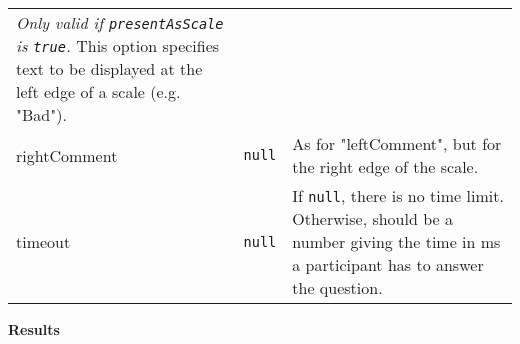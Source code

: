 \documentclass[
]{article}
\begin{document}
\begin{RaggedRight}
\begin{longtable}[]{p{1.7in}p{1in}p{3.15in}}
\begin{minipage}[t]{0.61\columnwidth}
\emph{Only valid if \texttt{presentAsScale} is \texttt{true}.} This
option specifies text to be displayed at the left edge of a scale (e.g.
"Bad").\strut
\end{minipage}\tabularnewline
\begin{minipage}[t]{0.16\columnwidth}\raggedright
rightComment\strut
\end{minipage} & \begin{minipage}[t]{0.14\columnwidth}\raggedright
\texttt{null}\strut
\end{minipage} & \begin{minipage}[t]{0.61\columnwidth}\raggedright
As for "leftComment", but for the right edge of the scale.\strut
\end{minipage}\tabularnewline
\begin{minipage}[t]{0.16\columnwidth}\raggedright
timeout\strut
\end{minipage} & \begin{minipage}[t]{0.14\columnwidth}\raggedright
\texttt{null}\strut
\end{minipage} & \begin{minipage}[t]{0.61\columnwidth}\raggedright
If \texttt{null}, there is no time limit. Otherwise, should be a number
giving the time in ms a participant has to answer the question.\strut
\end{minipage}\tabularnewline
\bottomrule
\end{longtable}\normalsize\end{RaggedRight}

\textbf{Results}
\end{document}
